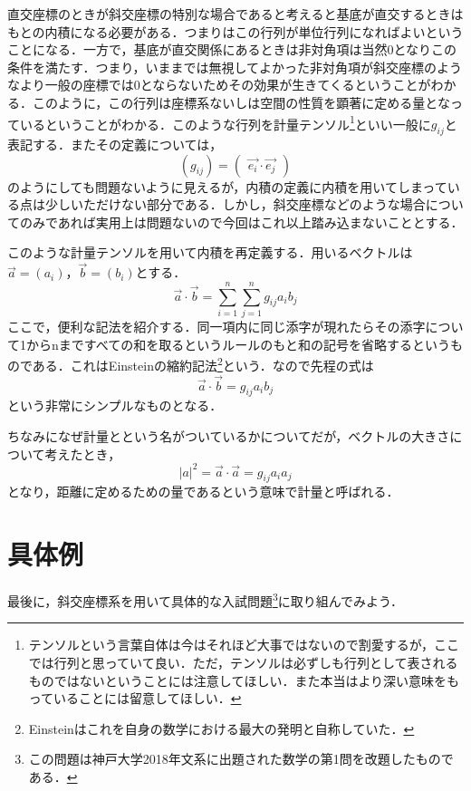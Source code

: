 \documentclass[dvipdfmx,a4]{jsarticle}
\begin{document}
直交座標のときが斜交座標の特別な場合であると考えると基底が直交するときはもとの内積になる必要がある．つまりはこの行列が単位行列になればよいということになる．一方で，基底が直交関係にあるときは非対角項は当然0となりこの条件を満たす．つまり，いままでは無視してよかった非対角項が斜交座標のようなより一般の座標では0とならないためその効果が生きてくるということがわかる．このように，この行列は座標系ないしは空間の性質を顕著に定める量となっているということがわかる．このような行列を計量テンソル\footnote{テンソルという言葉自体は今はそれほど大事ではないので割愛するが，ここでは行列と思っていて良い．ただ，テンソルは必ずしも行列として表されるものではないということには注意してほしい．また本当はより深い意味をもっていることには留意してほしい．}といい一般に\(g_{ij}\)と表記する．またその定義については，
\begin{equation*}
  (g_{ij}) = \begin{pmatrix}
    \vec{e_i} \cdot \vec{e_j}
  \end{pmatrix}
\end{equation*}
のようにしても問題ないように見えるが，内積の定義に内積を用いてしまっている点は少しいただけない部分である．しかし，斜交座標などのような場合についてのみであれば実用上は問題ないので今回はこれ以上踏み込まないこととする．

このような計量テンソルを用いて内積を再定義する．用いるベクトルは\(\vec{a} = (a_i)\)，\(\vec{b} = (b_i)\)とする．
\begin{equation*}
  \vec{a}\cdot \vec{b}=
  \sum ^n _{i=1} \sum ^n _{j=1} g_{ij} a_{i} b_{j}
\end{equation*}
ここで，便利な記法を紹介する．同一項内に同じ添字が現れたらその添字について1からnまですべての和を取るというルールのもと和の記号を省略するというものである．これはEinsteinの縮約記法\footnote{Einsteinはこれを自身の数学における最大の発明と自称していた．}という．なので先程の式は
\begin{equation*}
  \vec{a}\cdot \vec{b}=  g_{ij} a_{i} b_{j}
\end{equation*}
という非常にシンプルなものとなる．

ちなみになぜ計量とという名がついているかについてだが，ベクトルの大きさについて考えたとき，
\begin{equation*}
  |a|^2 = \vec{a}\cdot \vec{a}=  g_{ij} a_{i} a_{j}
\end{equation*}
となり，距離に定めるための量であるという意味で計量と呼ばれる．

\section{具体例}
最後に，斜交座標系を用いて具体的な入試問題\footnote{この問題は神戸大学2018年文系に出題された数学の第1問を改題したものである．}に取り組んでみよう．
\end{document}
